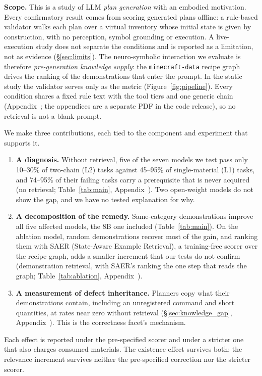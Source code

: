 \documentclass[letterpaper]{article} %
\newcommand{\secref}[1]{\S\ref{#1}}
\newcommand{\appref}[1]{Appendix~\getrefnumber{#1}}
\begin{document}
\textbf{Scope.}  This is a study of LLM \emph{plan generation} with an
embodied motivation.  Every confirmatory result comes from scoring generated
plans offline: a rule-based validator walks each plan over a virtual inventory
whose initial state is given by construction, with no perception, symbol
grounding or execution.  A live-execution study does not separate the
conditions and is reported as a limitation, not as evidence
(\secref{sec:limits}).  The neuro-symbolic interaction we evaluate is
therefore \emph{pre-generation knowledge supply}: the \texttt{minecraft-data}
recipe graph drives the ranking of the demonstrations that enter the prompt.
In the static study the validator serves only as the metric
(Figure~\ref{fig:pipeline}).  Every condition shares a fixed rule text with the
tool tiers and one generic chain (\appref{app:prompt}; the appendices are a separate PDF in the code release), so
no retrieval is not a blank prompt.

We make three contributions, each tied to the component and experiment that
supports it.
\begin{enumerate}\setlength\itemsep{1pt}
  \item \textbf{A diagnosis.}  Without retrieval, five of the seven models we
  test pass only 10--30\% of two-chain (L2) tasks against 45--95\% of
  single-material (L1) tasks, and 74--95\% of their failing tasks carry a
  prerequisite that is never acquired (no retrieval; Table~\ref{tab:main},
  \appref{app:failmodes}).  Two open-weight models do not show the gap, and we
  have no tested explanation for why.
  \item \textbf{A decomposition of the remedy.}  Same-category demonstrations
  improve all five affected models, the 8B one included
  (Table~\ref{tab:main}).  On the ablation model, random demonstrations
  recover most of the gain, and ranking them with SAER (State-Aware Example Retrieval), a training-free scorer
  over the recipe graph, adds a smaller increment that our tests do not
  confirm (demonstration retrieval, with SAER's ranking the one step that reads
  the graph; Table~\ref{tab:ablation}, \appref{app:mcnemar}).
  \item \textbf{A measurement of defect inheritance.}  Planners copy what their
  demonstrations contain, including an unregistered command and short
  quantities, at rates near zero without retrieval (\secref{sec:knowledge_gap}, \appref{app:demoquality}).  This is the
  correctness facet's mechanism.
\end{enumerate}
Each effect is reported under the pre-specified scorer and under a stricter
one that also charges consumed materials.  The existence effect survives both;
the relevance increment survives neither the pre-specified correction nor the
stricter scorer.
\end{document}
